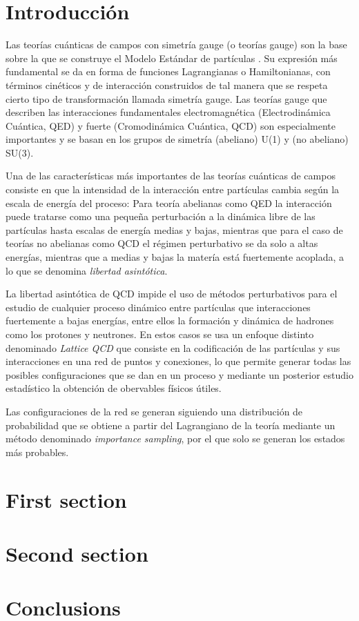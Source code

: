 \documentclass[a4paper,10pt]{article}
\begin{document}
\begin{multicols}{2}
\section{Introducción} 
Las teorías cuánticas de campos con simetría gauge (o teorías gauge) son la base sobre la que se construye el Modelo Estándar de partículas \cite{Peskin:1995ev}. Su expresión más fundamental se da en forma de funciones Lagrangianas o Hamiltonianas, con términos cinéticos y de interacción construidos de tal manera que se respeta cierto tipo de transformación llamada simetría gauge. Las teorías gauge que describen las interacciones fundamentales electromagnética (Electrodinámica Cuántica, QED) y fuerte (Cromodinámica Cuántica, QCD) son especialmente importantes y se basan en los grupos de simetría (abeliano) U(1) y (no abeliano) SU(3).

Una de las características más importantes de las teorías cuánticas de campos consiste en que la intensidad de la interacción entre partículas cambia según la escala de energía del proceso: Para teoría abelianas como QED la interacción puede tratarse como una pequeña perturbación a la dinámica libre de las partículas hasta escalas de energía medias y bajas, mientras que para el caso de teorías no abelianas como QCD el régimen perturbativo se da solo a altas energías, mientras que a medias y bajas la matería está fuertemente acoplada, a lo que se denomina \textit{libertad asintótica}.

La libertad asintótica de QCD impide el uso de métodos perturbativos para el estudio de cualquier proceso dinámico entre partículas que interacciones fuertemente a bajas energías, entre ellos la formación y dinámica de hadrones como los protones y neutrones. En estos casos se usa un enfoque distinto denominado \textit{Lattice QCD} \cite{particle_data_group_review_2018} que consiste en la codificación de las partículas y sus interacciones en una red de puntos y conexiones, lo que permite generar todas las posibles configuraciones que se dan en un proceso y mediante un posterior estudio estadístico la obtención de obervables físicos útiles. 

Las configuraciones de la red se generan siguiendo una distribución de probabilidad que se obtiene a partir del Lagrangiano de la teoría mediante un método denominado \textit{importance sampling}, por el que solo se generan los estados más probables. 



\section{First section}
\blindtext

\section{Second section}
\blindtext

\blindtext

\section{Conclusions}

\blindtext

\blindtext

\nocite{*}


\end{multicols}
\end{document}
